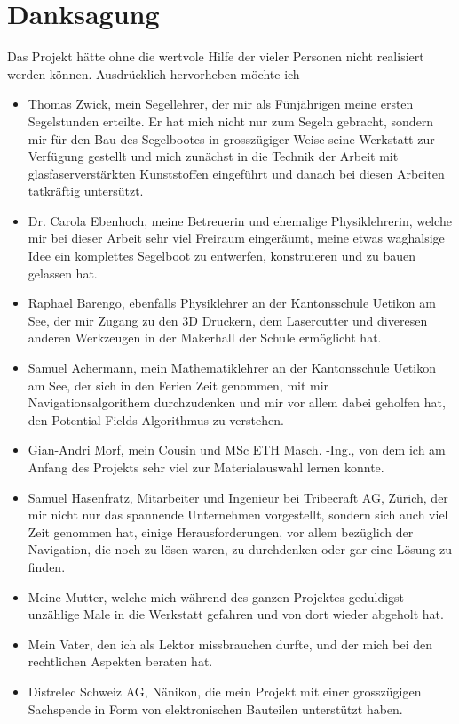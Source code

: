 

\chapter{Danksagung}
\label{chap:danksagung}
Das Projekt hätte ohne die wertvole Hilfe der vieler Personen nicht realisiert werden können. Ausdrücklich hervorheben möchte ich
\begin{itemize}
\item Thomas Zwick, mein Segellehrer, der mir als Fünjährigen meine ersten Segelstunden erteilte. Er hat mich nicht nur zum  Segeln gebracht, sondern mir für den Bau des Segelbootes in grosszügiger Weise seine Werkstatt zur Verfügung gestellt und mich zunächst in die Technik der Arbeit mit glasfaserverstärkten Kunststoffen eingeführt und danach bei diesen Arbeiten tatkräftig untersützt.
 \item Dr. Carola Ebenhoch, meine Betreuerin und ehemalige Physiklehrerin, welche mir bei dieser Arbeit sehr viel Freiraum eingeräumt, meine etwas waghalsige Idee ein komplettes Segelboot zu entwerfen, konstruieren und zu bauen gelassen hat.
  \item Raphael Barengo, ebenfalls Physiklehrer an der Kantonsschule Uetikon am See, der mir Zugang zu den 3D Druckern, dem Lasercutter und diveresen anderen Werkzeugen in der Makerhall der Schule ermöglicht hat.  
  \item Samuel Achermann, mein Mathematiklehrer an der Kantonsschule Uetikon am See, der sich in den Ferien Zeit genommen, mit mir Navigationsalgorithem durchzudenken und mir vor allem dabei geholfen hat, den Potential Fields Algorithmus zu verstehen.
  
  \item Gian-Andri Morf, mein Cousin und MSc ETH Masch. -Ing., von dem ich am Anfang des Projekts sehr viel zur Materialauswahl lernen konnte.
    \item Samuel Hasenfratz, Mitarbeiter und Ingenieur bei Tribecraft AG, Zürich, der mir nicht nur das spannende Unternehmen vorgestellt, sondern sich auch viel Zeit genommen hat, einige Herausforderungen, vor allem bezüglich der Navigation, die noch zu lösen waren, zu durchdenken oder gar eine Lösung zu finden.
\item Meine Mutter, welche mich während des ganzen Projektes geduldigst unzählige Male in die Werkstatt gefahren und von dort wieder abgeholt hat.
  \item  Mein Vater, den ich als Lektor missbrauchen durfte, und der mich bei den rechtlichen Aspekten beraten hat.
\item Distrelec Schweiz AG, Nänikon, die mein Projekt mit einer grosszügigen Sachspende in Form von elektronischen Bauteilen unterstützt haben. 
 
\end{itemize}
